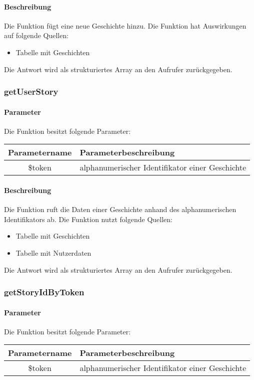 \paragraph{Beschreibung} Die Funktion fügt eine neue Geschichte hinzu. Die Funktion hat Auswirkungen auf folgende Quellen:
\begin{itemize}
	\item Tabelle mit Geschichten
\end{itemize}
Die Antwort wird als strukturiertes Array an den Aufrufer zurückgegeben.
\subsubsection{getUserStory}
\paragraph{Parameter} Die Funktion besitzt folgende Parameter:
\begin{table}[H]
	\begin{tabular}{|c|p{11cm}|}
		\hline
		\textbf{Parametername} & \textbf{Parameterbeschreibung} \\ \hline
		\$token & alphanumerischer Identifikator einer Geschichte \\ \hline
	\end{tabular}
\end{table}
\paragraph{Beschreibung} Die Funktion ruft die Daten einer Geschichte anhand des alphanumerischen Identifikators ab. Die Funktion nutzt folgende Quellen:
\begin{itemize}
	\item Tabelle mit Geschichten
	\item Tabelle mit Nutzerdaten
\end{itemize}
Die Antwort wird als strukturiertes Array an den Aufrufer zurückgegeben.
\subsubsection{getStoryIdByToken}
\paragraph{Parameter} Die Funktion besitzt folgende Parameter:
\begin{table}[H]
	\begin{tabular}{|c|p{11cm}|}
		\hline
		\textbf{Parametername} & \textbf{Parameterbeschreibung} \\ \hline
		\$token & alphanumerischer Identifikator einer Geschichte \\ \hline
	\end{tabular}
\end{table}

